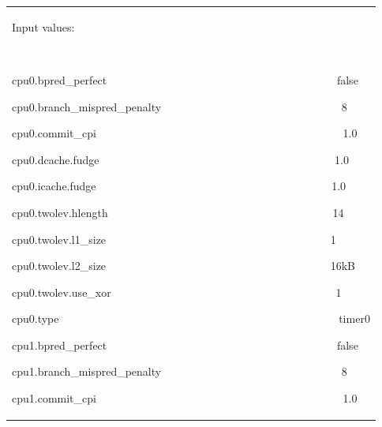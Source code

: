 \documentclass[a4paper]{article}
\begin{document}
\begin{flushleft}
\tablehead{}
\begin{tiny}
\begin{supertabular}{|m{6.34626in}|}
\hline
{\ttfamily Input values:}

~

{\ttfamily cpu0.bpred\_perfect
\ \ \ \ \ \ \ \ \ \ \ \ \ \ \ \ \ \ \ \ \ \ \ \ \ \ \ \ \ \ \ \ \ \ \ \ \ \ \ \ \ false}

{\ttfamily
cpu0.branch\_mispred\_penalty
\ \ \ \ \ \ \ \ \ \ \ \ \ \ \ \ \ \ \ \ \ \ \ \ \ \ \ \ \ \ \ \ 8}

{\ttfamily cpu0.commit\_cpi
\ \ \ \ \ \ \ \ \ \ \ \ \ \ \ \ \ \ \ \ \ \ \ \ \ \ \ \ \ \ \ \ \ \ \ \ \ \ \ \ \ \ \ \ 1.0}

{\ttfamily cpu0.dcache.fudge
\ \ \ \ \ \ \ \ \ \ \ \ \ \ \ \ \ \ \ \ \ \ \ \ \ \ \ \ \ \ \ \ \ \ \ \ \ \ \ \ \ \ 1.0}

{\ttfamily cpu0.icache.fudge
\ \ \ \ \ \ \ \ \ \ \ \ \ \ \ \ \ \ \ \ \ \ \ \ \ \ \ \ \ \ \ \ \ \ \ \ \ \ \ \ \ \ 1.0}

{\ttfamily cpu0.twolev.hlength
\ \ \ \ \ \ \ \ \ \ \ \ \ \ \ \ \ \ \ \ \ \ \ \ \ \ \ \ \ \ \ \ \ \ \ \ \ \ \ \ 14}

{\ttfamily cpu0.twolev.l1\_size
\ \ \ \ \ \ \ \ \ \ \ \ \ \ \ \ \ \ \ \ \ \ \ \ \ \ \ \ \ \ \ \ \ \ \ \ \ \ \ \ 1}

{\ttfamily cpu0.twolev.l2\_size
\ \ \ \ \ \ \ \ \ \ \ \ \ \ \ \ \ \ \ \ \ \ \ \ \ \ \ \ \ \ \ \ \ \ \ \ \ \ \ \ 16kB}

{\ttfamily cpu0.twolev.use\_xor
\ \ \ \ \ \ \ \ \ \ \ \ \ \ \ \ \ \ \ \ \ \ \ \ \ \ \ \ \ \ \ \ \ \ \ \ \ \ \ \ 1}

{\ttfamily cpu0.type
\ \ \ \ \ \ \ \ \ \ \ \ \ \ \ \ \ \ \ \ \ \ \ \ \ \ \ \ \ \ \ \ \ \ \ \ \ \ \ \ \ \ \ \ \ \ \ \ \ \ timer0}

{\ttfamily cpu1.bpred\_perfect
\ \ \ \ \ \ \ \ \ \ \ \ \ \ \ \ \ \ \ \ \ \ \ \ \ \ \ \ \ \ \ \ \ \ \ \ \ \ \ \ \ false}

{\ttfamily
cpu1.branch\_mispred\_penalty
\ \ \ \ \ \ \ \ \ \ \ \ \ \ \ \ \ \ \ \ \ \ \ \ \ \ \ \ \ \ \ \ 8}

{\ttfamily cpu1.commit\_cpi
\ \ \ \ \ \ \ \ \ \ \ \ \ \ \ \ \ \ \ \ \ \ \ \ \ \ \ \ \ \ \ \ \ \ \ \ \ \ \ \ \ \ \ \ 1.0}


\end{supertabular}
\end{tiny}
\end{flushleft}
\end{document}
